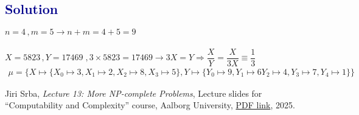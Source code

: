 \documentclass[12pt]{article}
\theoremstyle{definition}
\theoremstyle{plain}
\begin{document}
\subsection*{\textcolor{darkblue}{Solution}}
$n = 4\,, m = 5 \rightarrow n + m = 4+5=9$\\\\
$X = 5823\,, Y = 17469\;, 3 \times 5823 = 17469 \rightarrow 3X = Y \Rightarrow \dfrac{X}{Y} = \dfrac{X}{3X} \equiv \dfrac{1}{3}$
\[
\boxed{\begin{aligned}
\mu = \{X \mapsto \{X_0 \mapsto 3, X_1 \mapsto 2, X_2 \mapsto 8, X_3 \mapsto 5\}, Y \mapsto \{ Y_0 \mapsto 9, Y_1 \mapsto 6 Y_2 \mapsto 4, Y_3 \mapsto 7, Y_4 \mapsto 1 \}\}
\end{aligned}}
\]

\newpage
\begin{thebibliography}{9}

Jiri Srba,
\textit{Lecture 13: More NP-complete Problems},
Lecture slides for “Computability and Complexity” course, Aalborg University,
\href{https://homes.cs.aau.dk/~srba/courses/slides-CC-10/l13-2x3.pdf}{PDF link}, 2025.
\end{thebibliography}
\end{document}
